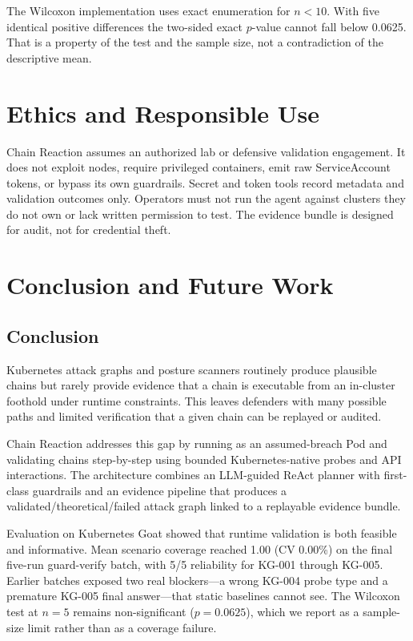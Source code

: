 \documentclass[conference]{IEEEtran}
\begin{document}
The Wilcoxon implementation uses exact enumeration for $n<10$. With five identical positive differences the two-sided exact $p$-value cannot fall below 0.0625. That is a property of the test and the sample size, not a contradiction of the descriptive mean.

\section{Ethics and Responsible Use}

Chain Reaction assumes an authorized lab or defensive validation engagement. It does not exploit nodes, require privileged containers, emit raw ServiceAccount tokens, or bypass its own guardrails. Secret and token tools record metadata and validation outcomes only. Operators must not run the agent against clusters they do not own or lack written permission to test. The evidence bundle is designed for audit, not for credential theft.

\section{Conclusion and Future Work}

\subsection{Conclusion}
Kubernetes attack graphs and posture scanners routinely produce plausible chains but rarely provide evidence that a chain is executable from an in-cluster foothold under runtime constraints. This leaves defenders with many possible paths and limited verification that a given chain can be replayed or audited.

Chain Reaction addresses this gap by running as an assumed-breach Pod and validating chains step-by-step using bounded Kubernetes-native probes and API interactions. The architecture combines an LLM-guided ReAct planner with first-class guardrails and an evidence pipeline that produces a validated/theoretical/failed attack graph linked to a replayable evidence bundle.

Evaluation on Kubernetes Goat showed that runtime validation is both feasible and informative. Mean scenario coverage reached 1.00 (CV 0.00\%) on the final five-run guard-verify batch, with 5/5 reliability for KG-001 through KG-005. Earlier batches exposed two real blockers---a wrong KG-004 probe type and a premature KG-005 final answer---that static baselines cannot see. The Wilcoxon test at $n=5$ remains non-significant ($p=0.0625$), which we report as a sample-size limit rather than as a coverage failure.
\end{document}
